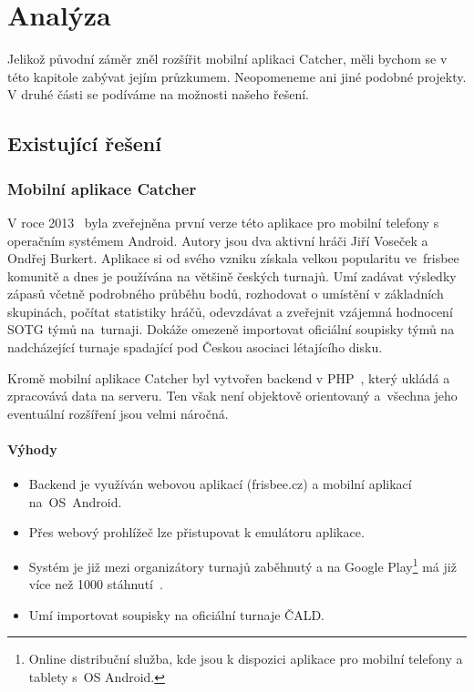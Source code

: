 \chapter{Analýza}

Jelikož původní záměr zněl rozšířit mobilní aplikaci Catcher,
měli bychom se v této kapitole zabývat jejím průzkumem. Neopomeneme ani jiné podobné projekty.
V druhé části se podíváme na možnosti našeho řešení.

\section{Existující řešení}

\subsection*{Mobilní aplikace Catcher}

V roce 2013~\cite{cald_catcher} byla zveřejněna první verze této aplikace pro mobilní telefony s operačním systémem Android.
Autory jsou dva aktivní hráči Jiří Voseček a Ondřej Burkert. Aplikace si od svého vzniku získala velkou popularitu
ve~frisbee komunitě a dnes je používána na většině českých turnajů. Umí zadávat výsledky
zápasů včetně podrobného průběhu bodů, rozhodovat o umístění v základních skupinách, počítat statistiky hráčů,
odevzdávat a zveřejnit vzájemná hodnocení SOTG týmů na~turnaji. Dokáže omezeně importovat oficiální soupisky týmů
na nadcházející turnaje spadající pod Českou asociaci létajícího disku.

Kromě mobilní aplikace Catcher byl vytvořen backend v PHP~\cite{php}, který ukládá a zpracovává data na serveru. Ten však není
objektově orientovaný a~všechna jeho eventuální rozšíření jsou velmi náročná.

\subsubsection*{Výhody}
\begin{itemize}
  \item Backend je využíván webovou aplikací (frisbee.cz) a mobilní aplikací na~OS~Android.
  \item Přes webový prohlížeč lze přistupovat k emulátoru aplikace.
  \item Systém je již mezi organizátory turnajů zaběhnutý a na Google Play\footnote{Online distribuční služba,
    kde jsou k dispozici aplikace pro mobilní telefony a tablety s~OS Android.}
    má již více než 1000 stáhnutí~\cite{catcher_play}.
  \item Umí importovat soupisky na oficiální turnaje ČALD.
\end{itemize}

